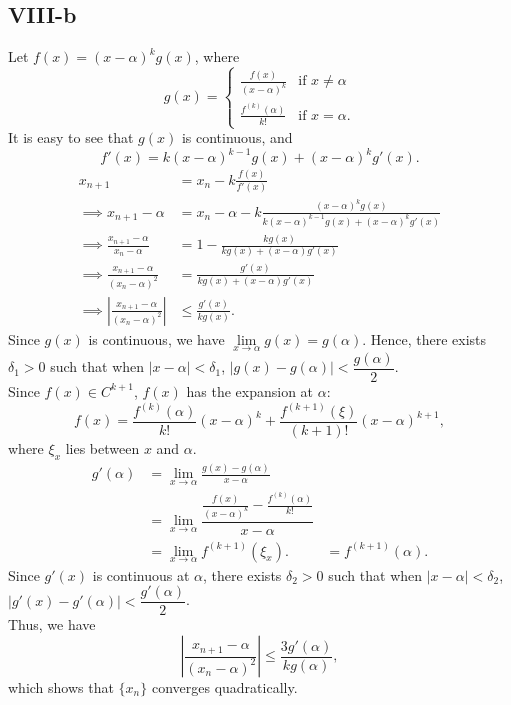 \documentclass[a4paper]{article}
\begin{document}
\subsection*{VIII-b}
Let $f(x) = (x - \alpha)^k g(x)$, where
\[
g(x)=
\begin{cases}
  \frac{f(x)}{(x-\alpha)^k} &\text{if } x \neq \alpha\\
  \frac{f^{(k)}(\alpha)}{k!} &\text{if } x = \alpha.
\end{cases}
\]
It is easy to see that $g(x)$ is continuous, and
\[
f'(x) = k(x-\alpha)^{k-1}g(x) + (x-\alpha)^kg'(x).
\]
\begin{align*}
  x_{n+1} &= x_n - k\frac{f(x)}{f'(x)}\\
  \implies x_{n+1} - \alpha &= x_n - \alpha - k\frac{(x - \alpha)^k g(x)}{k(x-\alpha)^{k-1}g(x) + (x-\alpha)^kg'(x)}\\
  \implies \frac{x_{n+1} - \alpha}{x_n - \alpha} &= 1 - \frac{kg(x)}{kg(x)+ (x - \alpha)g'(x)}\\
  \implies \frac{x_{n+1} - \alpha}{(x_n - \alpha)^2} &= \frac{g'(x)}{kg(x) + (x - \alpha)g'(x)}\\
  \implies \left|\frac{x_{n+1} - \alpha}{(x_n - \alpha)^2}\right| &\leq \frac{g'(x)}{kg(x)}.
\end{align*}
Since $g(x)$ is continuous, we have $\lim\limits_{x \to \alpha} g(x) = g(\alpha)$. Hence, there exists $\delta_1 > 0$ such that when $|x - \alpha| < \delta_1$, $|g(x) - g(\alpha)| < \dfrac{g(\alpha)}{2}$.\\
Since $f(x) \in C^{k+1}$, $f(x)$ has the expansion at $\alpha$:
\[
f(x) = \frac{f^{(k)}(\alpha)}{k!}(x - \alpha)^k + \frac{f^{(k+1)}(\xi)}{(k+1)!}(x - \alpha)^{k+1},
\]
where $\xi_x$ lies between $x$ and $\alpha$.
\begin{align*}
    g'(\alpha) &= \lim\limits_{x \to \alpha} \frac{g(x) - g(\alpha)}{x - \alpha}\\
    &= \lim\limits_{x \to \alpha} \dfrac{\frac{f(x)}{(x - \alpha)^k} - \frac{f^{(k)}(\alpha)}{k!}}{x - \alpha}\\
    &= \lim\limits_{x \to \alpha} f^{(k+1)}(\xi_x).
    &= f^{(k+1)}(\alpha).
\end{align*}
Since $g'(x)$ is continuous at $\alpha$, there exists $\delta_2 > 0$ such that when $|x - \alpha| < \delta_2$, $|g'(x) - g'(\alpha)| < \dfrac{g'(\alpha)}{2}$.\\
Thus, we have
\[
\left|\frac{x_{n+1} - \alpha}{(x_n - \alpha)^2}\right| \leq \frac{3g'(\alpha)}{kg(\alpha)},
\]
which shows that $\{x_n\}$ converges quadratically.

\end{document}
